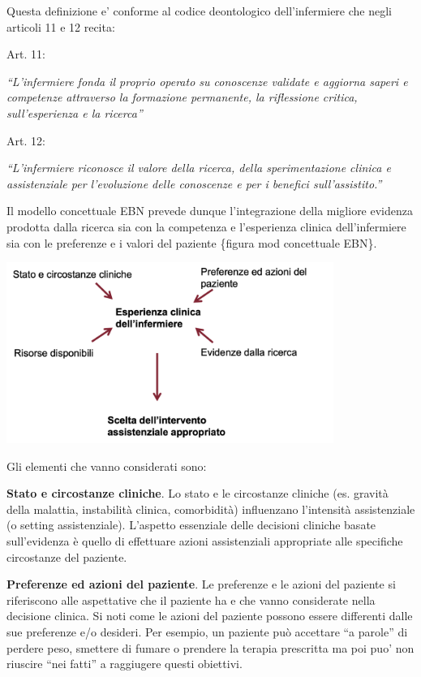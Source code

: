 \documentclass[]{book}
\begin{document}
Questa definizione e' conforme al codice deontologico dell'infermiere che negli articoli 11 e 12 recita:

Art. 11:

\emph{``L'infermiere fonda il proprio operato su conoscenze validate e aggiorna saperi e competenze attraverso la formazione permanente, la riflessione critica, sull'esperienza e la ricerca''}

Art. 12:

\emph{``L'infermiere riconosce il valore della ricerca, della sperimentazione clinica e assistenziale per l'evoluzione delle conoscenze e per i benefici sull'assistito.''}

Il modello concettuale EBN prevede dunque l'integrazione della migliore evidenza prodotta dalla ricerca sia con la competenza e l'esperienza clinica dell'infermiere sia con le preferenze e i valori del paziente \{figura mod concettuale EBN\}.

\includegraphics[width=0.8\textwidth,height=\textheight]{./img/mod-concettuale-ebn.png}

Gli elementi che vanno considerati sono:

\textbf{Stato e circostanze cliniche}. Lo stato e le circostanze cliniche (es. gravità della malattia, instabilità clinica, comorbidità) influenzano l'intensità assistenziale (o setting assistenziale). L'aspetto essenziale delle decisioni cliniche basate sull'evidenza è quello di effettuare azioni assistenziali appropriate alle specifiche circostanze del paziente.

\textbf{Preferenze ed azioni del paziente}. Le preferenze e le azioni del paziente si riferiscono alle aspettative che il paziente ha e che vanno considerate nella decisione clinica. Si noti come le azioni del paziente possono essere differenti dalle sue preferenze e/o desideri. Per esempio, un paziente può accettare ``a parole'' di perdere peso, smettere di fumare o prendere la terapia prescritta ma poi puo' non riuscire ``nei fatti'' a raggiugere questi obiettivi.
\end{document}
